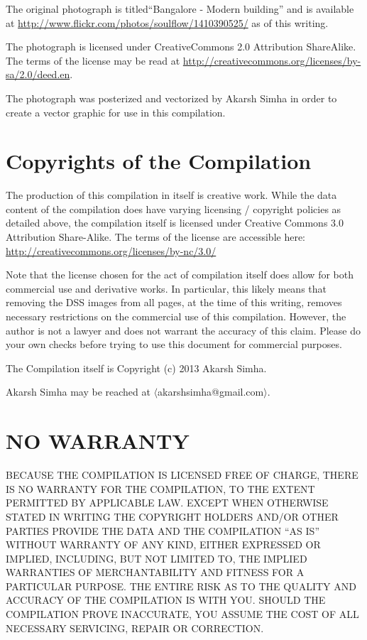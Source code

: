 \begin{itemize}
  The original photograph is titled``Bangalore - Modern building'' and
  is available at
  \url{http://www.flickr.com/photos/soulflow/1410390525/} as of this
  writing.

  The photograph is licensed under CreativeCommons 2.0 Attribution
  ShareAlike. The terms of the license may be read at
  \url{http://creativecommons.org/licenses/by-sa/2.0/deed.en}.

  The photograph was posterized and vectorized by Akarsh Simha in
  order to create a vector graphic for use in this compilation.

\end{itemize}

\section{Copyrights of the Compilation}

The production of this compilation in itself is creative work. While
the data content of the compilation does have varying licensing /
copyright policies as detailed above, the compilation itself is
licensed under Creative Commons 3.0 Attribution Share-Alike. The terms
of the license are accessible here:
\url{http://creativecommons.org/licenses/by-nc/3.0/}

Note that the license chosen for the act of compilation itself does
allow for both commercial use and derivative works. In particular,
this likely means that removing the DSS images from all pages, at the
time of this writing, removes necessary restrictions on the commercial
use of this compilation. However, the author is not a lawyer and does
not warrant the accuracy of this claim. Please do your own checks
before trying to use this document for commercial purposes.

The Compilation itself is Copyright (c) 2013 Akarsh Simha.

Akarsh Simha may be reached at $\langle$akarshsimha@gmail.com$\rangle$.

\section{NO WARRANTY}

  BECAUSE THE COMPILATION IS LICENSED FREE OF CHARGE, THERE IS NO
  WARRANTY FOR THE COMPILATION, TO THE EXTENT PERMITTED BY APPLICABLE
  LAW.  EXCEPT WHEN OTHERWISE STATED IN WRITING THE COPYRIGHT HOLDERS
  AND/OR OTHER PARTIES PROVIDE THE DATA AND THE COMPILATION ``AS IS''
  WITHOUT WARRANTY OF ANY KIND, EITHER EXPRESSED OR IMPLIED,
  INCLUDING, BUT NOT LIMITED TO, THE IMPLIED WARRANTIES OF
  MERCHANTABILITY AND FITNESS FOR A PARTICULAR PURPOSE.  THE ENTIRE
  RISK AS TO THE QUALITY AND ACCURACY OF THE COMPILATION IS WITH YOU.
  SHOULD THE COMPILATION PROVE INACCURATE, YOU ASSUME THE COST OF ALL
  NECESSARY SERVICING, REPAIR OR CORRECTION.

